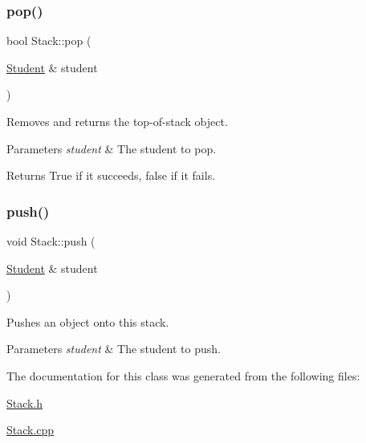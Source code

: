 \subsubsection{\texorpdfstring{pop()}{pop()}}
{\footnotesize\ttfamily bool Stack\+::pop (\begin{DoxyParamCaption}\item[{\hyperlink{class_student}{Student} \&}]{student }\end{DoxyParamCaption})}



Removes and returns the top-\/of-\/stack object. 


\begin{DoxyParams}{Parameters}
{\em student} & The student to pop.\\
\hline
\end{DoxyParams}
\begin{DoxyReturn}{Returns}
True if it succeeds, false if it fails. 
\end{DoxyReturn}
\mbox{\label{class_stack_a049c37e69420f3a13c9c5835ba88a0bc}} 
\subsubsection{\texorpdfstring{push()}{push()}}
{\footnotesize\ttfamily void Stack\+::push (\begin{DoxyParamCaption}\item[{\hyperlink{class_student}{Student} \&}]{student }\end{DoxyParamCaption})}



Pushes an object onto this stack. 


\begin{DoxyParams}{Parameters}
{\em student} & The student to push. \\
\hline
\end{DoxyParams}


The documentation for this class was generated from the following files\+:\begin{DoxyCompactItemize}
\item 
\hyperlink{_stack_8h}{Stack.\+h}\item 
\hyperlink{_stack_8cpp}{Stack.\+cpp}\end{DoxyCompactItemize}
